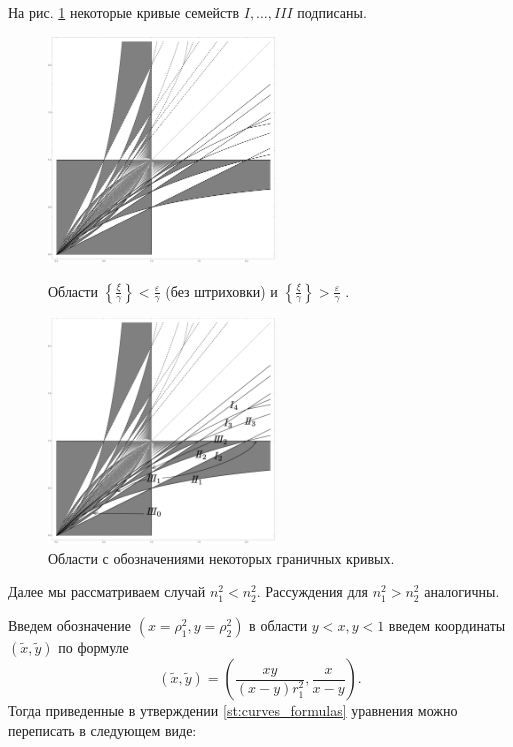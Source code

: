 На рис. \ref{fig:pt10:_B1_lattice_labeled} некоторые кривые семейств $I, \ldots, III$ подписаны. 
\begin{figure}[!htb]
\centering
\includegraphics[width=6cm]{images/section3_circular/B1_lattice.png}
    \caption{Области $\left\{ \frac{\xi}{\gamma} \right\} < \frac{\varepsilon}{\gamma}$ (без штриховки) и  $\left\{ \frac{\xi}{\gamma} \right\} > \frac{\varepsilon}{\gamma}$ .}
    \label{fig:pt10:_B1_lattice}
\endminipage\hfill
{}
\centering
\includegraphics[width=6cm]{images/section3_circular/B1_lattice_labeled.pdf}
    \caption{Области с обозначениями некоторых граничных кривых.}
    \label{fig:pt10:_B1_lattice_labeled}
\endminipage\hfill
\end{figure}


Далее мы рассматриваем случай $n_1^2 < n_2^2$. Рассуждения для $n_1^2 > n_2^2$ аналогичны.

Введем обозначение $(x=\rho_1^2, y=\rho_2^2)$ в области $y < x, y < 1$ введем координаты $(\widetilde{x}, \widetilde{y})$ по формуле 
\begin{equation}
(\widetilde{x}, \widetilde{y}) = \left(\frac{x y }{(x-y) r_1^2}, \frac{x}{x-y}\right).
\label{eq:coord_change}
\end{equation}
Тогда приведенные в утверждении \ref{st:curves_formulas} уравнения можно переписать в следующем виде:

